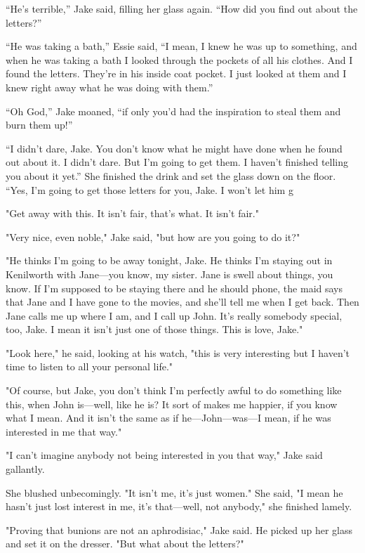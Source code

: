 \documentclass{novel}
\begin{document}
“He’s terrible,” Jake said, filling her glass again. “How did you find out about the letters?”

“He was taking a bath,” Essie said, “I mean, I knew he was up to something, and when he was taking a bath I looked through the pockets of all his clothes. And I found the letters. They’re in his inside coat pocket. I just looked at them and I knew right away what he was doing with them.”

“Oh God,” Jake moaned, “if only you’d had the inspiration to steal them and burn them up!”

“I didn’t dare, Jake. You don’t know what he might have done when he found out about it. I didn’t dare. But I’m going to get them. I haven’t finished telling you about it yet.” She finished the drink and set the glass down on the floor. “Yes, I’m going to get those letters for you, Jake. I won’t let him g

"Get away with this. It isn't fair, that's what. It isn't fair."

"Very nice, even noble," Jake said, "but how are you going to do it?"

"He thinks I'm going to be away tonight, Jake. He thinks I'm staying out in Kenilworth with Jane—you know, my sister. Jane is swell about things, you know. If I'm supposed to be staying there and he should phone, the maid says that Jane and I have gone to the movies, and she'll tell me when I get back. Then Jane calls me up where I am, and I call up John. It's really somebody special, too, Jake. I mean it isn't just one of those things. This is love, Jake."

"Look here," he said, looking at his watch, "this is very interesting but I haven't time to listen to all your personal life."

"Of course, but Jake, you don't think I'm perfectly awful to do something like this, when John is—well, like he is? It sort of makes me happier, if you know what I mean. And it isn't the same as if he—John—was—I mean, if he was interested in me that way."

"I can't imagine anybody not being interested in you that way," Jake said gallantly.

She blushed unbecomingly. "It isn't me, it's just women." She said, "I mean he hasn't just lost interest in me, it's that—well, not anybody," she finished lamely.

"Proving that bunions are not an aphrodisiac," Jake said. He picked up her glass and set it on the dresser. "But what about the letters?"
\end{document}
